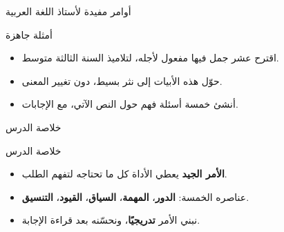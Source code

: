 \documentclass[aspectratio=169, 11pt, xcolor={table}]{beamer}
\begin{document}
\begin{frame}{أوامر مفيدة لأستاذ اللغة العربية}
    \begin{tbox}{\faChalkboardTeacher\quad أمثلة جاهزة}
        \begin{itemize}
            \item اقترح عشر جمل فيها مفعول لأجله، لتلاميذ السنة الثالثة متوسط.
            \item حوّل هذه الأبيات إلى نثر بسيط، دون تغيير المعنى.
            \item أنشئ خمسة أسئلة فهم حول النص الآتي، مع الإجابات.
        \end{itemize}
    \end{tbox}
\end{frame}

\begin{frame}{خلاصة الدرس}
    \begin{tbox}{\faCheckCircle\quad خلاصة الدرس}
        \begin{itemize}
            \item \textbf{الأمر الجيد} يعطي الأداة كل ما تحتاجه لتفهم الطلب.
            \item عناصره الخمسة: \textbf{الدور}، \textbf{المهمة}، \textbf{السياق}،
                  \textbf{القيود}، \textbf{التنسيق}.
            \item نبني الأمر \textbf{تدريجيًا}، ونحسّنه بعد قراءة الإجابة.
        \end{itemize}
    \end{tbox}
\end{frame}
\end{document}
